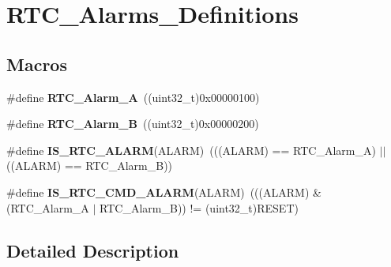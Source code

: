 \hypertarget{group___r_t_c___alarms___definitions}{}\section{R\+T\+C\+\_\+\+Alarms\+\_\+\+Definitions}
\label{group___r_t_c___alarms___definitions}
\subsection*{Macros}
\begin{DoxyCompactItemize}
\item 
\hypertarget{group___r_t_c___alarms___definitions_ga8d6daed1177365822e9f4e443ec394c7}{}\#define {\bfseries R\+T\+C\+\_\+\+Alarm\+\_\+\+A}~((uint32\+\_\+t)0x00000100)\label{group___r_t_c___alarms___definitions_ga8d6daed1177365822e9f4e443ec394c7}

\item 
\hypertarget{group___r_t_c___alarms___definitions_gaf51f54c28f0052d97a8764741218d372}{}\#define {\bfseries R\+T\+C\+\_\+\+Alarm\+\_\+\+B}~((uint32\+\_\+t)0x00000200)\label{group___r_t_c___alarms___definitions_gaf51f54c28f0052d97a8764741218d372}

\item 
\hypertarget{group___r_t_c___alarms___definitions_gab101ad18b0bcde557eb8caac469d7725}{}\#define {\bfseries I\+S\+\_\+\+R\+T\+C\+\_\+\+A\+L\+A\+R\+M}(A\+L\+A\+R\+M)~(((A\+L\+A\+R\+M) == R\+T\+C\+\_\+\+Alarm\+\_\+\+A) $\vert$$\vert$ ((A\+L\+A\+R\+M) == R\+T\+C\+\_\+\+Alarm\+\_\+\+B))\label{group___r_t_c___alarms___definitions_gab101ad18b0bcde557eb8caac469d7725}

\item 
\hypertarget{group___r_t_c___alarms___definitions_gae6b65274a46fc3a9f64eb0c9ed4c13e4}{}\#define {\bfseries I\+S\+\_\+\+R\+T\+C\+\_\+\+C\+M\+D\+\_\+\+A\+L\+A\+R\+M}(A\+L\+A\+R\+M)~(((A\+L\+A\+R\+M) \& (R\+T\+C\+\_\+\+Alarm\+\_\+\+A $\vert$ R\+T\+C\+\_\+\+Alarm\+\_\+\+B)) != (uint32\+\_\+t)R\+E\+S\+E\+T)\label{group___r_t_c___alarms___definitions_gae6b65274a46fc3a9f64eb0c9ed4c13e4}

\end{DoxyCompactItemize}


\subsection{Detailed Description}
